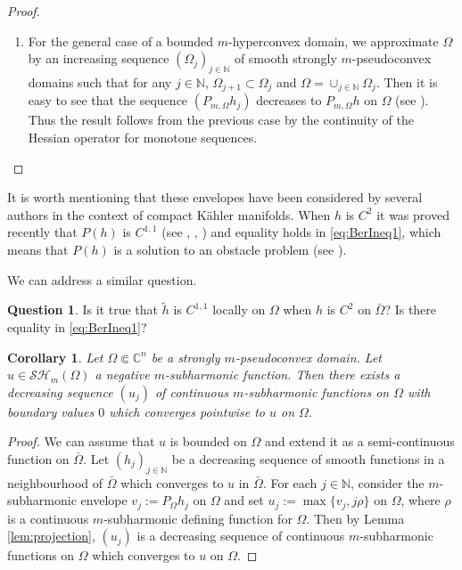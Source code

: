 \documentclass[11pt]{article}
\providecommand{\C}{}
\numberwithin{equation}{section}
\newtheorem{corollary}[theorem]{Corollary}
\theoremstyle{definition}
\newtheorem*{Question}{Question}
\newcommand{\N}{\mathbb{N}}
\renewcommand{\C}{\mathbb{C}}
\theoremstyle{plain}
\theoremstyle{definition}
\begin{document}
\begin{proof}
\begin{enumerate}
Summarizing, we have proved that for any $j \in \N$, $\psi_j \leq u_j \leq \tilde h $ on $\Omega$.
Therefore,
\[
0 \leq \tilde h - u_j \leq \tilde h - \psi_j = (1 \slash j) ( \tilde h - \psi + m \log j)\quad\text{on $\Omega$ for any $j \in \N^*$}.
\]
This proves that $u_j$ converges to $\tilde h$ uniformly on $\Omega$. Then since $u_j \leq h$ on $\Omega$, taking the limit as $j \to + \infty$ in \eqref{eq:BerEqu} we obtain inequality \eqref{eq:BerIneq2} by the continuity of the Hessian operators for uniform convergence (see \cite{Lu12}).

\item
For the general case of a bounded $m$-hyperconvex domain, we approximate $\Omega$ by an increasing sequence $(\Omega_j)_{j \in \N}$ of smooth strongly $m$-pseudoconvex domains such that for any $j \in \N$, $\Omega_{j + 1} \subset \Omega_j$ and $\Omega = \cup_{j \in \N} \Omega_j$.
Then it is easy to see that the sequence $(P_{m,\Omega} h_j)$ decreases to $P_{m,\Omega} h$ on $\Omega$ (see \cite{GLZ19}). Thus the result follows from the previous case by the continuity of the Hessian operator for monotone sequences.\qedhere
\end{enumerate}
\end{proof}

It is worth mentioning that these envelopes have been considered by several authors in the context of compact Kähler manifolds. When $h$ is $C^2$ it was proved recently that $P (h)$ is $C^{1,1}$ (see \cite{ChZh17}, \cite{T18}, \cite{Ber19}) and equality holds in \eqref{eq:BerIneq1}, which means that $P(h)$ is a solution to an obstacle problem (see \cite{BD12}).

We can address a similar question.

\begin{Question}
Is it true that $\tilde h$ is $C^{1,1}$ locally on $\Omega$ when $h$ is $C^2$ on $\bar \Omega$? Is there equality in \eqref{eq:BerIneq1}?
\end{Question}

\begin{corollary} \label{cor:smoothing} Let $\Omega \Subset \C^n$ be a strongly $m$-pseudoconvex domain. Let $u \in \mathcal {SH}_m (\Omega)$ a negative $m$-subharmonic function. Then there exists a decreasing sequence $(u_j)$ of continuous $m$-subharmonic functions on $\Omega$ with boundary values $0$ which converges pointwise to $u$ on $\Omega$.
\end{corollary}

\begin{proof} We can assume that $u$ is bounded on $\Omega$ and extend it as a semi-continuous function on $\bar \Omega$. Let $(h_j)_{j \in \N}$ be a decreasing sequence of smooth functions in a neighbourhood of $\bar \Omega$ which converges to $u$ in $\bar \Omega$.
For each $j \in \N$, consider the $m$-subharmonic envelope
$v_j:= P_{\Omega} h_j$ on $\Omega$ and set $u_j:= \max \{v_j, j \rho\}$ on $\Omega$, where $\rho$ is a continuous $m$-subharmonic defining function for $\Omega$. Then by Lemma \ref{lem:projection}, $(u_j)$ is a decreasing sequence of continuous $m$-subharmonic functions on $\Omega$ which converges to $u$ on $\Omega$.
\end{proof}
\end{document}
